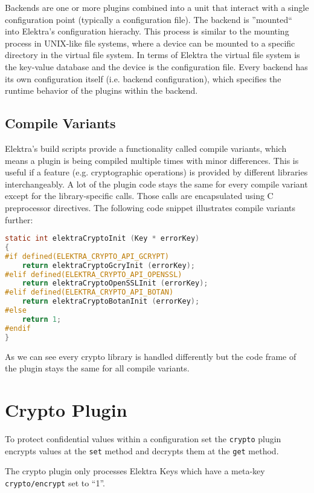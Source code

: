 Backends are one or more plugins combined into a unit that interact with a single configuration point (typically a configuration file).
The backend is ''mounted`` into Elektra's configuration hierachy.
This process is similar to the mounting process in UNIX-like file systems, where a device can be mounted to a specific directory in the virtual file system.
In terms of Elektra the virtual file system is the key-value database and the device is the configuration file.
Every backend has its own configuration itself (i.e. backend configuration), which specifies the runtime behavior of the plugins within the backend.

\subsection{Compile Variants}

Elektra's build scripts provide a functionality called compile variants, which means a plugin is being compiled multiple times with minor differences.
This is useful if a feature (e.g. cryptographic operations) is provided by different libraries interchangeably.
A lot of the plugin code stays the same for every compile variant except for the library-specific calls.
Those calls are encapsulated using C preprocessor directives.
The following code snippet illustrates compile variants further:

\begin{lstlisting}[language=C]
static int elektraCryptoInit (Key * errorKey)
{
#if defined(ELEKTRA_CRYPTO_API_GCRYPT)
	return elektraCryptoGcryInit (errorKey);
#elif defined(ELEKTRA_CRYPTO_API_OPENSSL)
	return elektraCryptoOpenSSLInit (errorKey);
#elif defined(ELEKTRA_CRYPTO_API_BOTAN)
	return elektraCryptoBotanInit (errorKey);
#else
	return 1;
#endif
}
\end{lstlisting}

As we can see every crypto library is handled differently but the code frame of the plugin stays the same for all compile variants.

\section{Crypto Plugin}\label{crypto-plugin}

To protect confidential values within a configuration set the
\texttt{crypto} plugin encrypts values at the \texttt{set} method and
decrypts them at the \texttt{get} method.

The crypto plugin only processes Elektra Keys which have a meta-key
\texttt{crypto/encrypt} set to ``1''.


